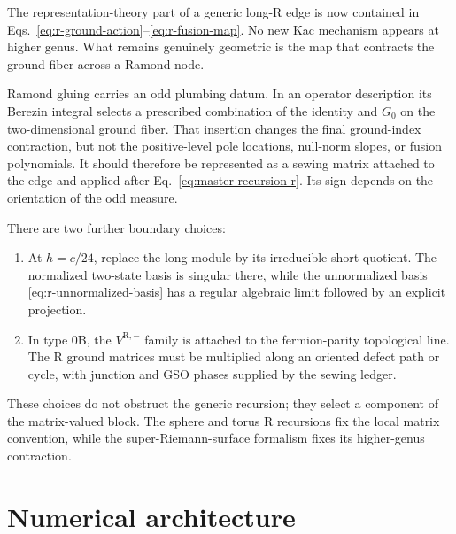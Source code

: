 \documentclass[11pt]{article}
\newcommand{\R}{\mathrm{R}}
\begin{document}
The representation-theory part of a generic long-R edge is now contained in
Eqs.~\eqref{eq:r-ground-action}--\eqref{eq:r-fusion-map}.  No new Kac
mechanism appears at higher genus.  What remains genuinely geometric is the
map that contracts the ground fiber across a Ramond node.

Ramond gluing carries an odd plumbing datum.  In an operator description its
Berezin integral selects a prescribed combination of the identity and $G_0$
on the two-dimensional ground fiber.  That insertion changes the final
ground-index contraction, but not the positive-level pole locations,
null-norm slopes, or fusion polynomials.  It should therefore be represented
as a sewing matrix attached to the edge and applied after
Eq.~\eqref{eq:master-recursion-r}.  Its sign depends on the orientation of the
odd measure.

There are two further boundary choices:
\begin{enumerate}
 \item At $h=c/24$, replace the long module by its irreducible short quotient.
 The normalized two-state basis is singular there, while the unnormalized
 basis \eqref{eq:r-unnormalized-basis} has a regular algebraic limit followed
 by an explicit projection.
 \item In type 0B, the $V^{\R,-}$ family is attached to the fermion-parity
 topological line.  The R ground matrices must be multiplied along an
 oriented defect path or cycle, with junction and GSO phases supplied by the
 sewing ledger.
\end{enumerate}
These choices do not obstruct the generic recursion; they select a component
of the matrix-valued block.  The sphere and torus R recursions fix the local
matrix convention, while the super-Riemann-surface formalism fixes its
higher-genus contraction.

\section{Numerical architecture}
\label{sec:numerics}
\end{document}
